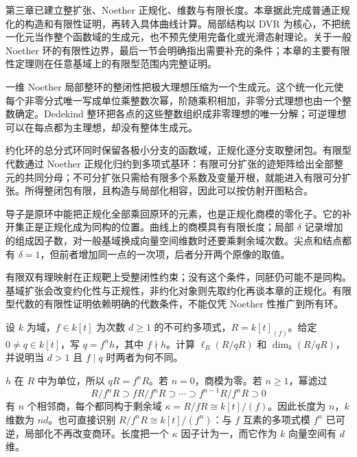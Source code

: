 \ProseParagraphBreak

第三章已建立整扩张、Noether 正规化、维数与有限长度。本章据此完成普通正规化的构造和有限性证明，再转入具体曲线计算。局部结构以 DVR 为核心，不把统一化元当作整个函数域的生成元，也不预先使用完备化或光滑态射理论。关于一般 Noether 环的有限性边界，最后一节会明确指出需要补充的条件；本章的主要有限性定理则在任意基域上的有限型范围内完整证明。






\begin{chaptersummary}
	一维 Noether 局部整环的整闭性把极大理想压缩为一个生成元。这个统一化元使每个非零分式唯一写成单位乘整数次幂，阶随乘积相加，非零分式理想也由一个整数确定。Dedekind 整环把各点的这些整数组织成非零理想的唯一分解；可逆理想可以在每点都为主理想，却没有整体生成元。

	\ProseParagraphBreak

	约化环的总分式环同时保留各极小分支的函数域，正规化逐分支取整闭包。有限型代数通过 Noether 正规化归约到多项式基环：有限可分扩张的迹矩阵给出全部整元的共同分母；不可分扩张只需给有限多个系数及变量开根，就能进入有限可分扩张。所得整闭包有限，且构造与局部化相容，因此可以按仿射开图粘合。

	\ProseParagraphBreak

	导子是原环中能把正规化全部乘回原环的元素，也是正规化商模的零化子。它的补开集正是正规化成为同构的位置。曲线上的商模具有有限长度；局部 \(\delta\) 记录增加的组成因子数，对一般基域换成向量空间维数时还要乘剩余域次数。尖点和结点都有 \(\delta=1\)，但前者增加同一点的一次项，后者分开两个原像的取值。

	\ProseParagraphBreak

	有限双有理映射在正规靶上受整闭性约束；没有这个条件，同胚仍可能不是同构。基域扩张会改变约化性与正规性，非约化对象则先取约化再谈本章的正规化。有限型代数的有限性证明依赖明确的代数条件，不能仅凭 Noether 性推广到所有环。
\end{chaptersummary}

\BookExercises

\begin{exercise}\label{g5:ex:dvr-residue-degree-length}
	设 \(k\) 为域，\(f\in k[t]\) 为次数 \(d\geq1\) 的不可约多项式，\(R=k[t]_{(f)}\)。给定 \(0\ne q\in k[t]\)，写 \(q=f^nh\)，其中 \(f\nmid h\)。计算 \(\ell_R(R/qR)\) 和 \(\dim_k(R/qR)\)，并说明当 \(d>1\) 且 \(f\mid q\) 时两者为何不同。
\end{exercise}
\begin{solution}
	\(h\) 在 \(R\) 中为单位，所以 \(qR=f^nR\)。若 \(n=0\)，商模为零。若 \(n\geq1\)，幂滤过
	\[
		R/f^nR\supset fR/f^nR\supset\cdots
		\supset f^{n-1}R/f^nR\supset0
	\]
	有 \(n\) 个相邻商，每个都同构于剩余域
	\(\kappa=R/fR\cong k[t]/(f)\)。因此长度为 \(n\)，\(k\) 维数为 \(nd\)。也可直接识别
	\(R/f^nR\cong k[t]/(f^n)\)：与 \(f\) 互素的多项式模 \(f^n\) 已可逆，局部化不再改变商环。长度把一个 \(\kappa\) 因子计为一，而它作为 \(k\) 向量空间有 \(d\) 维。
\end{solution}

